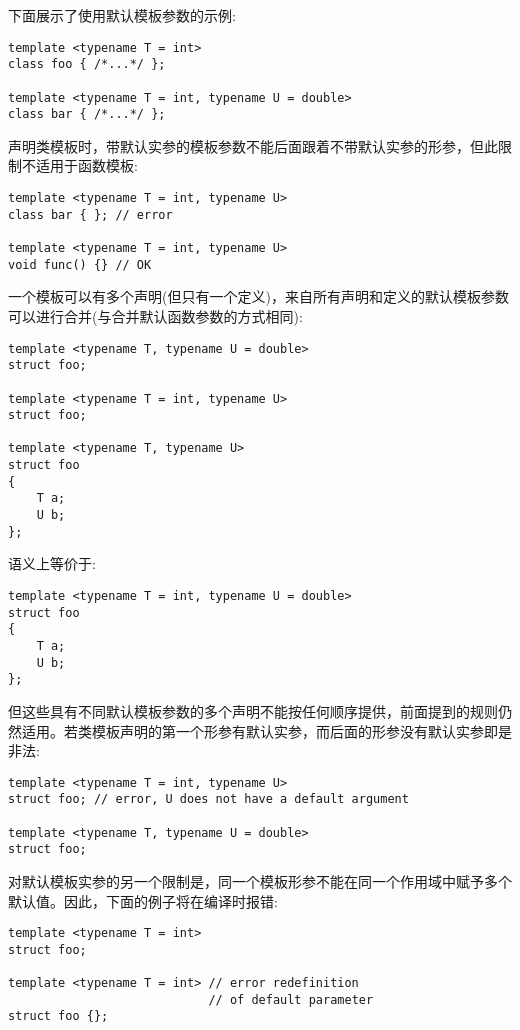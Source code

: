 下面展示了使用默认模板参数的示例:

\begin{lstlisting}[style=styleCXX]
template <typename T = int>
class foo { /*...*/ };

template <typename T = int, typename U = double>
class bar { /*...*/ };
\end{lstlisting}

声明类模板时，带默认实参的模板参数不能后面跟着不带默认实参的形参，但此限制不适用于函数模板:

\begin{lstlisting}[style=styleCXX]
template <typename T = int, typename U>
class bar { }; // error

template <typename T = int, typename U>
void func() {} // OK
\end{lstlisting}

一个模板可以有多个声明(但只有一个定义)，来自所有声明和定义的默认模板参数可以进行合并(与合并默认函数参数的方式相同):

\begin{lstlisting}[style=styleCXX]
template <typename T, typename U = double>
struct foo;

template <typename T = int, typename U>
struct foo;

template <typename T, typename U>
struct foo
{
	T a;
	U b;
};
\end{lstlisting}

语义上等价于:

\begin{lstlisting}[style=styleCXX]
template <typename T = int, typename U = double>
struct foo
{
	T a;
	U b;
};
\end{lstlisting}

但这些具有不同默认模板参数的多个声明不能按任何顺序提供，前面提到的规则仍然适用。若类模板声明的第一个形参有默认实参，而后面的形参没有默认实参即是非法:

\begin{lstlisting}[style=styleCXX]
template <typename T = int, typename U>
struct foo; // error, U does not have a default argument

template <typename T, typename U = double>
struct foo;
\end{lstlisting}

对默认模板实参的另一个限制是，同一个模板形参不能在同一个作用域中赋予多个默认值。因此，下面的例子将在编译时报错:

\begin{lstlisting}[style=styleCXX]
template <typename T = int>
struct foo;

template <typename T = int> // error redefinition
                            // of default parameter
struct foo {};
\end{lstlisting}

